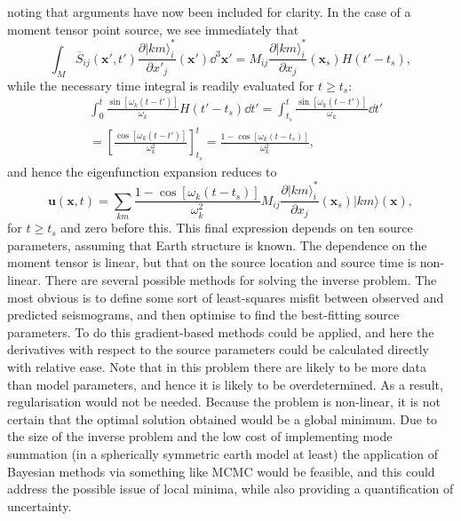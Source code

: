 \documentclass[a4paper,10pt]{paper}
\begin{document}
\begin{enumerate}
\begin{enumerate}
noting that arguments have now been included for clarity. In the case of a moment tensor point source, we see immediately that
\begin{equation*}
    \int_{M}\overline{S}_{ij}(\mathbf{x}',t')\frac{\partial|km\rangle_{i}^{*}}{\partial x'_{j}}(\mathbf{x}')\dd^{3}\mathbf{x}' = M_{ij}\frac{\partial|km\rangle_{i}^{*}}{\partial x_{j}}(\mathbf{x}_{s})H(t'-t_{s}),
\end{equation*}
while the necessary time integral is readily evaluated for $t\ge t_{s}$:
\begin{align*}
    &\int_{0}^{t}\frac{\sin[\omega_{k}(t-t')]}{\omega_{k}}H(t'-t_{s})\dd t' = \int_{t_s}^{t}\frac{\sin[\omega_{k}(t-t')]}{\omega_{k}}\dd t' \\ &= \left[\frac{\cos[\omega_k(t-t')]}{\omega_k^2}\right]_{t_s}^t = \frac{1-\cos[\omega_{k}(t-t_{s})]}{\omega_{k}^{2}},
\end{align*}
and hence the eigenfunction expansion reduces to
\begin{equation*}
    \mathbf{u}(\mathbf{x},t)=\sum_{km}\frac{1-\cos[\omega_{k}(t-t_{s})]}{\omega_{k}^{2}}M_{ij}\frac{\partial|km\rangle_{i}^{*}}{\partial x_{j}}(\mathbf{x}_{s})|km\rangle(\mathbf{x}),
\end{equation*}
for $t\ge t_{s}$ and zero before this. This final expression depends on ten source parameters, assuming that Earth structure is known. The dependence on the moment tensor is linear, but that on the source location and source time is non-linear. There are several possible methods for solving the inverse problem. The most obvious is to define some sort of least-squares misfit between observed and predicted seismograms, and then optimise to find the best-fitting source parameters. To do this gradient-based methods could be applied, and here the derivatives with respect to the source parameters could be calculated directly with relative ease. Note that in this problem there are likely to be more data than model parameters, and hence it is likely to be overdetermined. As a result, regularisation would not be needed. Because the problem is non-linear, it is not certain that the optimal solution obtained would be a global minimum. Due to the size of the inverse problem and the low cost of implementing mode summation (in a spherically symmetric earth model at least) the application of Bayesian methods via something like MCMC would be feasible, and this could address the possible issue of local minima, while also providing a quantification of uncertainty.

\end{enumerate}


\end{enumerate}
\end{document}
